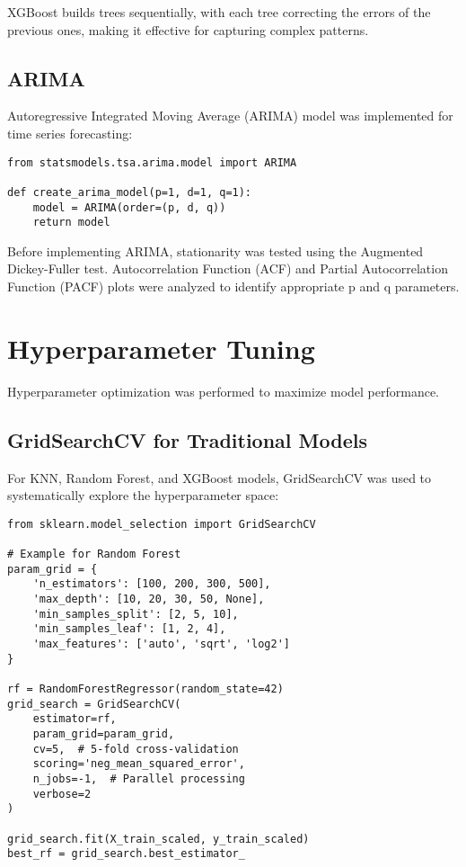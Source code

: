 \documentclass[12pt]{article}
\begin{document}
XGBoost builds trees sequentially, with each tree correcting the errors of the previous ones, making it effective for capturing complex patterns.

\subsection{ARIMA}
\label{subsec:arima}

Autoregressive Integrated Moving Average (ARIMA) model was implemented for time series forecasting:

\begin{verbatim}
from statsmodels.tsa.arima.model import ARIMA

def create_arima_model(p=1, d=1, q=1):
    model = ARIMA(order=(p, d, q))
    return model
\end{verbatim}

Before implementing ARIMA, stationarity was tested using the Augmented Dickey-Fuller test. Autocorrelation Function (ACF) and Partial Autocorrelation Function (PACF) plots were analyzed to identify appropriate p and q parameters.

\section{Hyperparameter Tuning}
\label{sec:hyperparameter_tuning}

Hyperparameter optimization was performed to maximize model performance.

\subsection{GridSearchCV for Traditional Models}
\label{subsec:gridsearchcv}

For KNN, Random Forest, and XGBoost models, GridSearchCV was used to systematically explore the hyperparameter space:

\begin{verbatim}
from sklearn.model_selection import GridSearchCV

# Example for Random Forest
param_grid = {
    'n_estimators': [100, 200, 300, 500],
    'max_depth': [10, 20, 30, 50, None],
    'min_samples_split': [2, 5, 10],
    'min_samples_leaf': [1, 2, 4],
    'max_features': ['auto', 'sqrt', 'log2']
}

rf = RandomForestRegressor(random_state=42)
grid_search = GridSearchCV(
    estimator=rf,
    param_grid=param_grid,
    cv=5,  # 5-fold cross-validation
    scoring='neg_mean_squared_error',
    n_jobs=-1,  # Parallel processing
    verbose=2
)

grid_search.fit(X_train_scaled, y_train_scaled)
best_rf = grid_search.best_estimator_
\end{verbatim}
\end{document}
